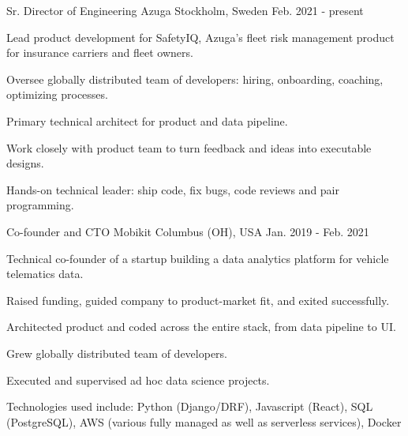 

\begin{cventries}

  \cventry
    {Sr. Director of Engineering} %
    {Azuga} %
    {Stockholm, Sweden} %
    {Feb. 2021 - present} %
    {
      \begin{cvitems} %
        \item {Lead product development for SafetyIQ, Azuga's fleet risk management product for insurance carriers and fleet owners.}
        \item {Oversee globally distributed team of developers: hiring, onboarding, coaching, optimizing processes.}
        \item {Primary technical architect for product and data pipeline.}
        \item {Work closely with product team to turn feedback and ideas into executable designs.}
        \item {Hands-on technical leader: ship code, fix bugs, code reviews and pair programming.}
      \end{cvitems}
    }

  \cventry
    {Co-founder and CTO} %
    {Mobikit} %
    {Columbus (OH), USA} %
    {Jan. 2019 - Feb. 2021} %
    {
      \begin{cvitems} %
        \item {Technical co-founder of a startup building a data analytics platform for vehicle telematics data.}
        \item {Raised funding, guided company to product-market fit, and exited successfully.}
        \item {Architected product and coded across the entire stack, from data pipeline to UI.}
        \item {Grew globally distributed team of developers.}
        \item {Executed and supervised ad hoc data science projects.}
        \item {Technologies used include: Python (Django/DRF), Javascript (React), SQL (PostgreSQL), AWS (various fully managed as well as serverless services), Docker}
      \end{cvitems}
    }


\end{cventries}
